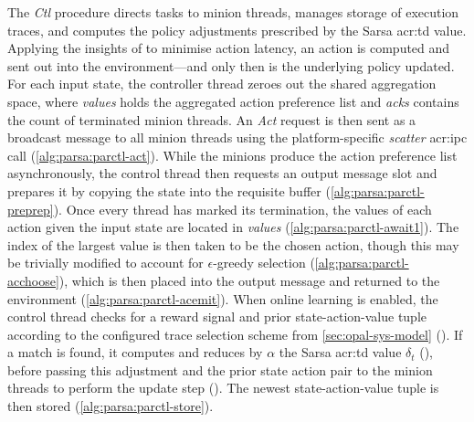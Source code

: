 The \emph{Ctl} procedure directs tasks to minion threads, manages storage of execution traces, and computes the policy adjustments prescribed by the Sarsa \gls{acr:td} value.
Applying the insights of \textcite{DBLP:journals/firai/TravnikMSP18} to minimise action latency, an action is computed and sent out into the environment---and only then is the underlying policy updated.
For each input state, the controller thread zeroes out the shared aggregation space, where \emph{values} holds the aggregated action preference list and \emph{acks} contains the count of terminated minion threads.
An \emph{Act} request is then sent as a broadcast message to all minion threads using the platform-specific \emph{scatter} \gls{acr:ipc} call (\cref{alg:parsa:parctl-act}).
While the minions produce the action preference list asynchronously, the control thread then requests an output message slot and prepares it by copying the state into the requisite buffer (\cref{alg:parsa:parctl-preprep}).
Once every thread has marked its termination, the values of each action given the input state are located in \emph{values} (\cref{alg:parsa:parctl-await1}).
The index of the largest value is then taken to be the chosen action, though this may be trivially modified to account for $\epsilon$-greedy selection (\cref{alg:parsa:parctl-acchoose}), which is then placed into the output message and returned to the environment (\cref{alg:parsa:parctl-acemit}).
When online learning is enabled, the control thread checks for a reward signal and prior state-action-value tuple according to the configured trace selection scheme from \cref{sec:opal-sys-model} ().
If a match is found, it computes and reduces by $\alpha$ the Sarsa \gls{acr:td} value $\delta_t$ (), before passing this adjustment and the prior state action pair to the minion threads to perform the update step ().
The newest state-action-value tuple is then stored (\cref{alg:parsa:parctl-store}).

